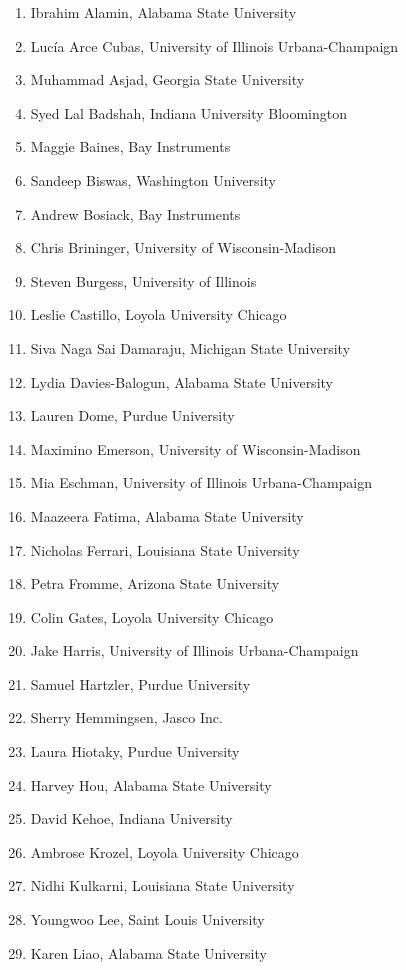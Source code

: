 \begin{multicols}{2}
	\begin{enumerate}
\item Ibrahim	Alamin,	Alabama State University 
\item Lucía	Arce Cubas,	University of Illinois Urbana-Champaign
\item Muhammad	Asjad,	Georgia State University
\item Syed Lal 	Badshah,	Indiana University Bloomington
\item Maggie	Baines,	Bay Instruments
\item Sandeep 	Biswas,	Washington University
\item Andrew	Bosiack,	Bay Instruments
\item Chris	Brininger,	University of Wisconsin-Madison
\item Steven	Burgess,	University of Illinois
\item Leslie	Castillo,	Loyola University Chicago
\item Siva Naga Sai	Damaraju,	Michigan State University
\item Lydia	Davies-Balogun,	Alabama State University
\item Lauren	Dome,	Purdue University
\item Maximino 	Emerson,	University of Wisconsin-Madison
\item Mia 	Eschman,	University of Illinois Urbana-Champaign
\item Maazeera	Fatima,	Alabama State University
\item Nicholas	Ferrari,	Louisiana State University
\item Petra	Fromme,	Arizona State University
\item Colin	Gates,	Loyola University Chicago
\item Jake	Harris,	University of Illinois Urbana-Champaign
\item Samuel	Hartzler,	Purdue University
\item Sherry	Hemmingsen,	Jasco Inc.
\item Laura	Hiotaky,	Purdue University
\item Harvey 	Hou,	Alabama State University
\item David	Kehoe,	Indiana University
\item Ambrose	Krozel,	Loyola University Chicago
\item Nidhi	Kulkarni,	Louisiana State University
\item Youngwoo	Lee,	Saint Louis University
\item Karen	Liao,	Alabama State University

\end{enumerate}
\end{multicols}
